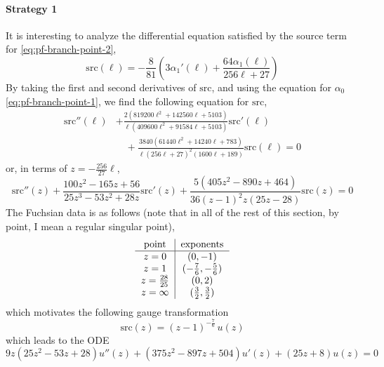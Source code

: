 \documentclass[11pt, a4paper]{article}
\numberwithin{equation}{section}
\begin{document}
\paragraph{Strategy 1}
It is interesting to analyze the differential equation satisfied by the source term for \cref{eq:pf-branch-point-2},
\begin{equation}
  \mathrm{src}(\ell) = -\frac{8}{81} \left(3 \alpha _1'(\ell )+\frac{64 \alpha _1(\ell )}{256 \ell +27}\right)
\end{equation}
By taking the first and second derivatives of $\mathrm{src}$, and using the equation for $\alpha_0$ \cref{eq:pf-branch-point-1}, we find the following equation for $\mathrm{src}$,
\begin{equation}
  \begin{aligned}
    \mathrm{src}''(\ell) &+ \frac{2 \left(819200 \ell ^2+142560 \ell +5103\right)}{\ell  \left(409600 \ell ^2+91584 \ell +5103\right)} \mathrm{src}'(\ell) \\
    &\quad + \frac{3840 \left(61440 \ell ^2+14240 \ell +783\right)}{\ell  (256 \ell +27)^2 (1600 \ell +189)} \mathrm{src}(\ell) = 0
  \end{aligned}
\end{equation}
or, in terms of $z = -\tfrac{256}{27}\ell$,
\begin{equation}
  \mathrm{src}''(z) + \frac{100 z^2-165 z+56}{25 z^3-53 z^2+28 z} \mathrm{src}'(z) + \frac{5 \left(405 z^2-890 z+464\right)}{36 (z-1)^2 z (25 z-28)} \mathrm{src}(z) = 0
\end{equation}
The Fuchsian data is as follows (note that in all of the rest of this section, by point, I mean a regular singular point),
\begin{equation}
\begin{tabular}{c|c}
point & exponents \\
\hline
$z=0$      & $(0, -1)$ \\
$z=1$      & $(-\tfrac76, -\tfrac56)$ \\
$z=\tfrac{28}{25}$ & $(0, 2)$ \\
$z=\infty$ & $(\tfrac32, \tfrac32)$ \\
\end{tabular}
\end{equation}
which motivates the following gauge transformation
\begin{equation}
  \mathrm{src}(z) = (z-1)^{-\tfrac76} \, u(z)
\end{equation}
which leads to the ODE
\begin{equation}
  9 z \left(25 z^2-53 z+28\right) u''(z)+\left(375 z^2-897 z+504\right) u'(z)+(25 z+8) u(z) = 0
\end{equation}
\end{document}
